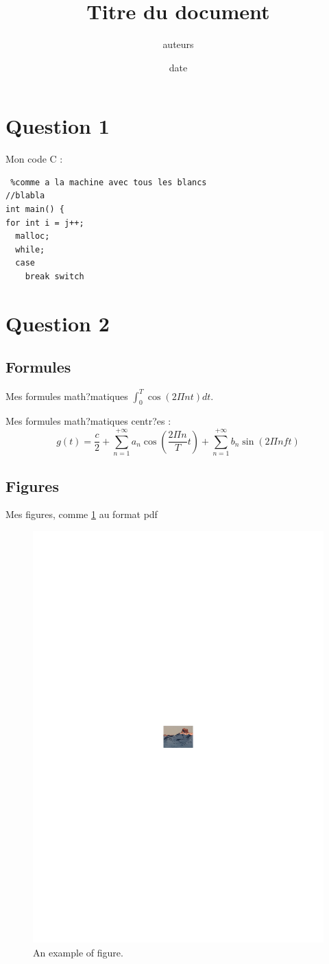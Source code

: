 \documentclass[a4paper,french,11pt]{article}
\title{Titre du document}
\author{auteurs}
\date{date}
\begin{document}
\maketitle


\tableofcontents
\newpage

\section{Question 1}

Mon code C :

\begin{verbatim} %comme a la machine avec tous les blancs
//blabla
int main() {
for int i = j++;
  malloc;
  while;
  case
    break switch
\end{verbatim}

\section{Question 2}

\subsection{Formules}

Mes formules math?matiques $\int_{0}^{T}\cos(2\Pi nt)dt$.

Mes formules math?matiques centr?es :
$$g(t) = \frac{c}{2} + \sum_{n=1}^{+\infty}a_n \cos \left(\frac{2\Pi n}{T}t\right) + \sum_{n=1}^{+\infty}b_n \sin(2\Pi nft)$$

\subsection{Figures}

Mes figures, comme \ref{fig-toto} au format pdf

\begin{figure}[htbp] %
\centering
\includegraphics[width=0.3\linewidth]{./page1}
\caption{An example of figure. }
\label{fig-toto}
\end{figure}
\end{document}
